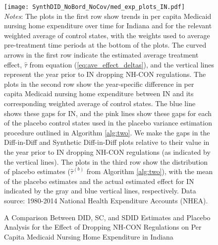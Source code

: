 \documentclass[../Main.tex]{subfiles}
\begin{document}
\newpage
{}
\begin{figure}[t] 
    \setlength{}
	\caption{\label{fig:med_exp_plots_in} \centering A Comparison Between DID, SC, and SDID Estimates and Placebo Analysis for the Effect of Dropping NH-CON Regulations on Per Capita Medicaid Nursing Home Expenditure in Indiana} {\centering\texttt{[image: SynthDID\_NoBord\_NoCov/med\_exp\_plots\_IN.pdf]}}
    \vspace{-1.4cm}\\
    \scriptsize
		\textit{Notes}: The plots in the first row show trends in per capita Medicaid nursing home expenditure over time for Indiana and for the relevant weighted average of control states, with the weights used to average pre-treatment time periods at the bottom of the plots. The curved arrows in the first row indicate the estimated average treatment effect, $\hat{\tau}$ from equation (\ref{eq:ave_effect_deltas}), and the vertical lines represent the year prior to IN dropping NH-CON regulations. The plots in the second row show the year-specific difference in per capita Medicaid nursing home expenditure between IN and its corresponding weighted average of control states. The blue line shows these gaps for IN, and the pink lines show these gaps for each of the placebo control states used in the placebo variance estimation procedure outlined in Algorithm \ref{alg:two}. We make the gaps in the Diff-in-Diff and Synthetic Diff-in-Diff plots relative to their value in the year prior to IN dropping NH-CON regulations (as indicated by the vertical lines). The plots in the third row show the distribution of placebo estimates ($\hat{\tau}^{(b)}$ from Algorithm \ref{alg:two}), with the mean of the placebo estimates and the actual estimated effect for IN indicated by the gray and blue vertical lines, respectively. Data source: 1980-2014 National Health Expenditure Accounts (NHEA).
\end{figure}
\restoregeometry
\clearpage
\end{document}
